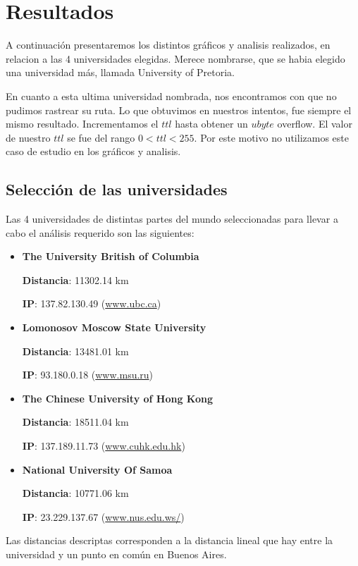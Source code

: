 \section{Resultados}	
A continuaci\'on presentaremos los distintos gr\'aficos y analisis realizados, en relacion a las 4 universidades elegidas. Merece nombrarse, que se habia elegido una universidad m\'as, llamada University of Pretoria.

En cuanto a esta ultima universidad nombrada, nos encontramos con que no pudimos rastrear su ruta. Lo que obtuvimos en nuestros intentos, fue siempre el mismo resultado. Incrementamos el $ttl$ hasta obtener un $ubyte$ overflow. El valor de nuestro $ttl$ se fue del rango $0 < ttl < 255$.
Por este motivo no utilizamos este caso de estudio en los gr\'aficos y analisis.


\subsection{Selección de las universidades}
Las 4 universidades de distintas partes del mundo seleccionadas para llevar a cabo el análisis requerido son las siguientes: 

\begin{itemize}
 \item {\bf The University British of Columbia}
 
	{\bf Distancia}: 11302.14 km 
	
	{\bf IP}: 137.82.130.49 (\url{www.ubc.ca}{})
 
 \item {\bf Lomonosov Moscow State University}

	{\bf Distancia}: 13481.01 km
	
	{\bf IP}: 93.180.0.18 (\url{www.msu.ru}{})
 
 \item {\bf The Chinese University of Hong Kong}

	{\bf Distancia}: 18511.04 km
	
	{\bf IP}: 137.189.11.73 (\url{www.cuhk.edu.hk})
 
 \item {\bf National University Of Samoa}
 
	{\bf Distancia}: 10771.06 km
	
	{\bf IP}: 23.229.137.67 (\url{www.nus.edu.ws/}{})
 
\end{itemize}

Las distancias descriptas corresponden a la distancia lineal que hay entre la universidad y un punto en común en Buenos Aires.


